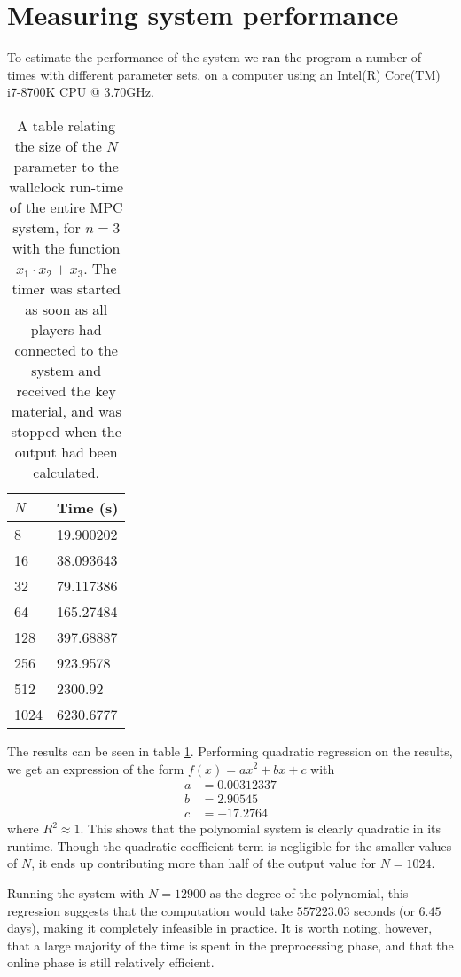 \documentclass[../main.tex]{subfiles}
\begin{document}
\section{Measuring system performance}
To estimate the performance of the system we ran the program a number of times with different parameter sets, on a computer using an Intel(R) Core(TM) i7-8700K CPU @ 3.70GHz.

\begin{table}
    \centering
    \begin{tabular}{l|l}
        $N$  & Time (s)  \\
        \hline
        8    & 19.900202 \\
        16   & 38.093643 \\
        32   & 79.117386 \\
        64   & 165.27484 \\
        128  & 397.68887 \\
        256  & 923.9578  \\
        512  & 2300.92   \\
        1024 & 6230.6777
    \end{tabular}
    \caption{A table relating the size of the $N$ parameter to the wallclock run-time of the entire MPC system, for $n = 3$ with the function $x_1 \cdot x_2 + x_3$. The timer was started as soon as all players had connected to the system and received the key material, and was stopped when the output had been calculated.}
    \label{tab:synthetic-division-performance}
\end{table}

The results can be seen in table \ref{tab:synthetic-division-performance}. Performing quadratic regression on the results, we get an expression of the form $f(x) = a x^2 + b x + c$ with
\begin{align*}
    a & = 0.00312337 \\
    b & = 2.90545    \\
    c & = -17.2764
\end{align*}
where $R^2 \approx 1$. This shows that the polynomial system is clearly quadratic in its runtime. Though the quadratic coefficient term is negligible for the smaller values of $N$, it ends up contributing more than half of the output value for $N = 1024$.

Running the system with $N = 12900$ as the degree of the polynomial, this regression suggests that the computation would take $557223.03$ seconds (or $6.45$ days), making it completely infeasible in practice.
It is worth noting, however, that a large majority of the time is spent in the preprocessing phase, and that the online phase is still relatively efficient.
\end{document}
